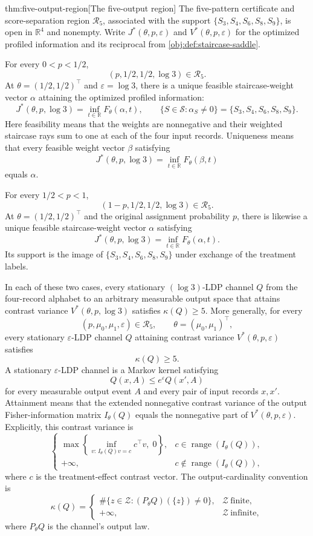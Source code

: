 \documentclass[11pt]{article}
\begin{document}
\begin{theoremv}{thm:five-output-region}[The five-output region]
The five-pattern certificate and score-separation region \(\mathcal R_5\), associated with the support \(\{S_3,S_4,S_6,S_8,S_9\}\), is open in \(\mathbb R^4\) and nonempty. Write \(J^*(\theta,p,\varepsilon)\) and \(V^*(\theta,p,\varepsilon)\) for the optimized profiled information and its reciprocal from \cref{obj:def:staircase-saddle}.

For every \(0<p<1/2\),
\[
(p,1/2,1/2,\log 3)\in\mathcal R_5.
\]
At \(\theta=(1/2,1/2)^\top\) and \(\varepsilon=\log 3\), there is a unique feasible staircase-weight vector \(\alpha\) attaining the optimized profiled information:
\[
J^*(\theta,p,\log 3)
=
\inf_{t\in\mathbb R}F_\theta(\alpha,t),
\qquad
\{S\in\mathcal S:\alpha_S\ne0\}
=
\{S_3,S_4,S_6,S_8,S_9\}.
\]
Here feasibility means that the weights are nonnegative and their weighted staircase rays sum to one at each of the four input records. Uniqueness means that every feasible weight vector \(\beta\) satisfying
\[
J^*(\theta,p,\log 3)
=
\inf_{t\in\mathbb R}F_\theta(\beta,t)
\]
equals \(\alpha\).

For every \(1/2<p<1\),
\[
(1-p,1/2,1/2,\log 3)\in\mathcal R_5.
\]
At \(\theta=(1/2,1/2)^\top\) and the original assignment probability \(p\), there is likewise a unique feasible staircase-weight vector \(\alpha\) satisfying
\[
J^*(\theta,p,\log 3)
=
\inf_{t\in\mathbb R}F_\theta(\alpha,t).
\]
Its support is the image of \(\{S_3,S_4,S_6,S_8,S_9\}\) under exchange of the treatment labels.

In each of these two cases, every stationary \((\log 3)\)-LDP channel \(Q\) from the four-record alphabet to an arbitrary measurable output space that attains contrast variance \(V^*(\theta,p,\log 3)\) satisfies \(\kappa(Q)\ge5\). More generally, for every
\[
(p,\mu_0,\mu_1,\varepsilon)\in\mathcal R_5,
\qquad
\theta=(\mu_0,\mu_1)^\top,
\]
every stationary \(\varepsilon\)-LDP channel \(Q\) attaining contrast variance \(V^*(\theta,p,\varepsilon)\) satisfies
\[
\kappa(Q)\ge5.
\]
A stationary \(\varepsilon\)-LDP channel is a Markov kernel satisfying
\[
Q(x,A)\le e^\varepsilon Q(x',A)
\]
for every measurable output event \(A\) and every pair of input records \(x,x'\). Attainment means that the extended nonnegative contrast variance of the output Fisher-information matrix \(I_\theta(Q)\) equals the nonnegative part of \(V^*(\theta,p,\varepsilon)\). Explicitly, this contrast variance is
\[
\begin{cases}
\displaystyle
\max\!\left\{
\inf_{v:\,I_\theta(Q)v=c}c^\top v,\;0
\right\},
& c\in\operatorname{range}(I_\theta(Q)),\\[4pt]
+\infty,
& c\notin\operatorname{range}(I_\theta(Q)),
\end{cases}
\]
where \(c\) is the treatment-effect contrast vector. The output-cardinality convention is
\[
\kappa(Q)=
\begin{cases}
\#\{z\in\mathcal Z:(P_\theta Q)(\{z\})\ne0\},
& \mathcal Z\ \text{finite},\\
+\infty,
& \mathcal Z\ \text{infinite},
\end{cases}
\]
where \(P_\theta Q\) is the channel's output law.
\end{theoremv}
\end{document}
